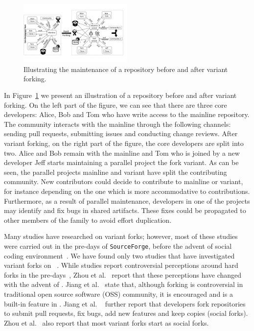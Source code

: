 \begin{figure}[ht]
  \begin{center}
  \small
  \vspace{-10pt}
    \includegraphics[width=0.5\textwidth]{figures/Collaboration.pdf}
  \end{center}
  \caption{Illustrating the maintenance of a repository before and after variant forking.}
  \vspace{-10pt}
  \label{fig:forking}
\end{figure}

In Figure~\ref{fig:forking} we present an illustration of a repository before and after variant forking. 
On the left part of the figure, we can see that there are three core developers: Alice, Bob and Tom who have write access to the mainline repository. 
The community interacts with the mainline through the following channels: sending pull requests, submitting issues and conducting change reviews. 
After variant forking, on the right part of the figure, the core developers are split into two. 
Alice and Bob remain with the mainline and Tom who is joined by a new developer Jeff starts maintaining a parallel project the fork variant. 
As can be seen, the parallel projects mainline and variant have split the contributing community. New contributors could decide to contribute to mainline or variant, for instance depending on the one which is more accommodative to contributions.
Furthermore, as a result of parallel maintenance, developers in one of the projects may identify and fix bugs in shared artifacts. 
These fixes could be propagated to other members of the family to avoid effort duplication.

Many studies have researched on variant forks; however, most of these studies were carried out in the pre-\scp days of \texttt{SourceForge}, before the advent of social coding environment~\cite{Linus:2012Perspectives,Gregorio:2012,Viseur:2012Forks,Linus:2013CodeForking,Laurent:2008,Linus:2011ToFork}. 
We have found only two studies that have investigated variant forks on \gh~\cite{businge2018appfamilies,Zhou:2020}.  
While studies report controversial perceptions around hard forks in the pre-\gh days~\cite{Chua:Forking:2017,Dixion:2009Forks,Ernst:2010,Linus:2011ToFork,Linus:2014Hackers,Raymond:Cathedral:2001}, Zhou et al.~\cite{Zhou:2020} report that these perceptions have changed with the advent of \gh. Jiang et al.~\cite{Lo:2017} state that, although forking is controversial in traditional open source software (OSS) community, it is encouraged and is a built-in feature in \gh. Jiang et al. ~\cite{Lo:2017} further report that developers fork repositories to submit pull requests, fix bugs, add new features and keep copies (social forks). 
Zhou et al.~\cite{Zhou:2020} also report that most variant forks start as social forks. 

